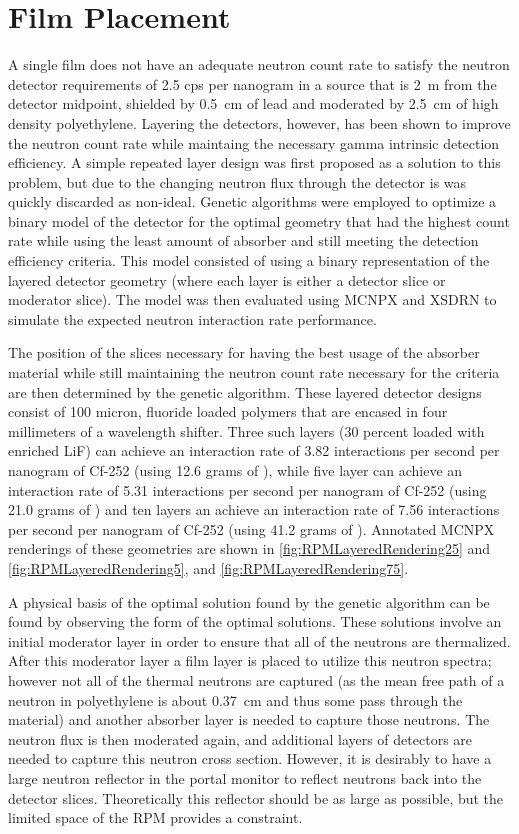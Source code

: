 \section{Film Placement}
A single film does not have an adequate neutron count rate to satisfy the neutron detector requirements of 2.5 cps per nanogram  in a source that is \SI{2}{\m} from the detector midpoint, shielded by \SI{0.5}{\cm} of lead and moderated by \SI{2.5}{\cm} of high density polyethylene.
Layering the detectors, however, has been shown to improve the neutron count rate while maintaing the necessary gamma intrinsic detection efficiency.
A simple repeated layer design was first proposed as a solution to this problem, but due to the changing neutron flux through the detector is was quickly discarded as non-ideal.
Genetic algorithms were employed to optimize a binary model of the detector for the optimal geometry that had the highest count rate while using the least amount of absorber and still meeting the detection efficiency criteria.
This model consisted of using a binary representation of the layered detector geometry (where each layer is either a detector slice or moderator slice).
The model was then evaluated using MCNPX and XSDRN to simulate the expected neutron interaction rate performance.

The position of the slices necessary for having the best usage of the absorber material while still maintaining the neutron count rate necessary for the criteria are then determined by the genetic algorithm.
These layered detector designs consist of 100 micron,  fluoride loaded polymers that are encased in four millimeters of a wavelength shifter.
Three such layers (30 percent loaded with enriched LiF) can achieve an interaction rate of 3.82 interactions per second per nanogram of Cf-252 (using 12.6 grams of ), while five layer can achieve an interaction rate of 5.31 interactions per second per nanogram of Cf-252 (using 21.0 grams of )  and ten layers an achieve an interaction rate of 7.56 interactions per second per nanogram of Cf-252 (using 41.2 grams of ).
Annotated MCNPX renderings of these geometries are shown in \autoref{fig:RPMLayeredRendering25} and \autoref{fig:RPMLayeredRendering5}, and \autoref{fig:RPMLayeredRendering75}.

A physical basis of the optimal solution found by the genetic algorithm can be found by observing the form of the optimal solutions.
These solutions involve an initial moderator layer in order to ensure that all of the neutrons are thermalized.
After this moderator layer a film layer is placed to utilize this neutron spectra; however not all of the thermal neutrons are captured (as the mean free path of a neutron in polyethylene is about \SI{0.37}{\cm} and thus some pass through the material) and another absorber layer is needed to capture those neutrons.  
The neutron flux is then moderated again, and additional layers of detectors are needed to capture this neutron cross section.
However, it is desirably to have a large neutron reflector in the portal monitor to reflect neutrons back into the detector slices. 
Theoretically this reflector should be as large as possible, but the limited space of the RPM provides a constraint.


